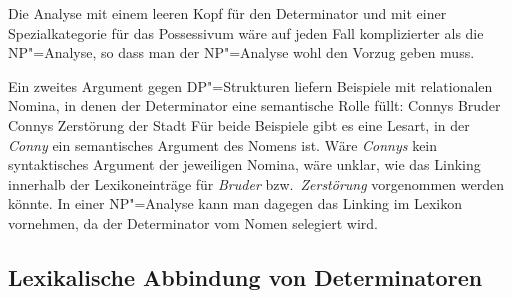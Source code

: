 Die Analyse mit einem leeren Kopf für den Determinator und mit einer Spezialkategorie für das Possessivum wäre auf jeden Fall komplizierter
als die NP"=Analyse, so dass man der NP"=Analyse wohl den Vorzug geben muss.


Ein zweites Argument gegen DP"=Strukturen liefern Beispiele mit relationalen Nomina, in denen der
Determinator eine semantische Rolle füllt:
\eal
\ex Connys Bruder
\ex Connys Zerstörung der Stadt
\zl
Für beide Beispiele gibt es eine Lesart, in der \emph{Conny} ein semantisches Argument des Nomens ist. Wäre
\emph{Connys} kein syntaktisches Argument der jeweiligen Nomina, wäre unklar, wie das Linking
innerhalb der Lexikoneinträge für \emph{Bruder} bzw.\ \emph{Zerstörung} vorgenommen werden
könnte. In einer NP"=Analyse kann man dagegen das Linking im Lexikon vornehmen, da der Determinator
vom Nomen selegiert wird.%
%
\indexmrsend

\subsection{Lexikalische Abbindung von Determinatoren}
\label{Abschnitt-Lexikalische Abbindung von Determinatoren}

